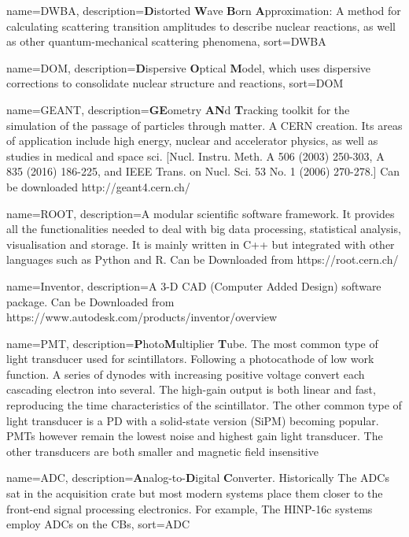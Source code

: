 \makeglossaries

{
    name=DWBA,
    description={\textbf{D}istorted \textbf{W}ave \textbf{B}orn \textbf{A}pproximation: A method for calculating scattering transition amplitudes to describe nuclear reactions, as well as other quantum-mechanical scattering phenomena},
    sort={DWBA}
}
 
{
    name=DOM,
    description={\textbf{D}ispersive \textbf{O}ptical \textbf{M}odel, which uses dispersive corrections to consolidate nuclear structure and reactions},
    sort={DOM}
}
 
{
  name=GEANT,
  description={\textbf{GE}ometry \textbf{AN}d \textbf{T}racking toolkit for the simulation of the passage of particles through matter. A CERN creation. Its areas of application include high energy, nuclear and accelerator physics, as well as studies in medical and space sci. [Nucl. Instru. Meth. A 506 (2003) 250-303, A 835 (2016) 186-225, and IEEE Trans. on Nucl. Sci. 53 No. 1 (2006) 270-278.] \n Can be downloaded http://geant4.cern.ch/}
}

{
  name=ROOT,
  description={A modular scientific software framework. It provides all the functionalities needed to deal with big data processing, statistical analysis, visualisation and storage. It is mainly written in C++ but integrated with other languages such as Python and R. \n Can be Downloaded from https://root.cern.ch/}
}

{
  name=Inventor,
  description={A 3-D CAD (Computer Added Design) software package. Can be Downloaded from https://www.autodesk.com/products/inventor/overview}
}

{
  name=PMT,
  description={\textbf{P}hoto\textbf{M}ultiplier \textbf{T}ube.  The most common type of light transducer used for scintillators. Following a photocathode of low work function. A series of dynodes with increasing positive voltage convert each cascading electron into several. The high-gain output is both linear and fast, reproducing the time characteristics of the scintillator. The other common type of light transducer is a PD with a solid-state version (SiPM) becoming popular. PMTs however remain the lowest noise and highest gain light transducer.  The other transducers are both smaller and magnetic field insensitive}
}

{
  name=ADC,
  description={\textbf{A}nalog-to-\textbf{D}igital \textbf{C}onverter. Historically The ADCs sat in the acquisition crate but most modern systems place them closer to the front-end signal processing electronics. For example, The HINP-16c systems employ ADCs on the CBs},
  sort={ADC}
}

